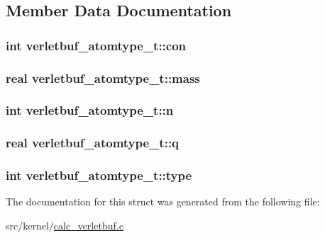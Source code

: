 \subsection{\-Member \-Data \-Documentation}
\hypertarget{structverletbuf__atomtype__t_abaac3df59f28024779971c44b56c6dd4}{
\subsubsection[{con}]{\setlength{\rightskip}{0pt plus 5cm}int {\bf verletbuf\-\_\-atomtype\-\_\-t\-::con}}}\label{structverletbuf__atomtype__t_abaac3df59f28024779971c44b56c6dd4}
\hypertarget{structverletbuf__atomtype__t_a94eec80ecfe84c264488d0a6d2857cc5}{
\subsubsection[{mass}]{\setlength{\rightskip}{0pt plus 5cm}real {\bf verletbuf\-\_\-atomtype\-\_\-t\-::mass}}}\label{structverletbuf__atomtype__t_a94eec80ecfe84c264488d0a6d2857cc5}
\hypertarget{structverletbuf__atomtype__t_a288b199386422f8781b4fb594a9b34a8}{
\subsubsection[{n}]{\setlength{\rightskip}{0pt plus 5cm}int {\bf verletbuf\-\_\-atomtype\-\_\-t\-::n}}}\label{structverletbuf__atomtype__t_a288b199386422f8781b4fb594a9b34a8}
\hypertarget{structverletbuf__atomtype__t_a4fafcf81c7af586f1e08bbcd43666adb}{
\subsubsection[{q}]{\setlength{\rightskip}{0pt plus 5cm}real {\bf verletbuf\-\_\-atomtype\-\_\-t\-::q}}}\label{structverletbuf__atomtype__t_a4fafcf81c7af586f1e08bbcd43666adb}
\hypertarget{structverletbuf__atomtype__t_ad5277b4fc99f12a3d46eda97a2650aa8}{
\subsubsection[{type}]{\setlength{\rightskip}{0pt plus 5cm}int {\bf verletbuf\-\_\-atomtype\-\_\-t\-::type}}}\label{structverletbuf__atomtype__t_ad5277b4fc99f12a3d46eda97a2650aa8}


\-The documentation for this struct was generated from the following file\-:\begin{DoxyCompactItemize}
\item 
src/kernel/\hyperlink{calc__verletbuf_8c}{calc\-\_\-verletbuf.\-c}\end{DoxyCompactItemize}
